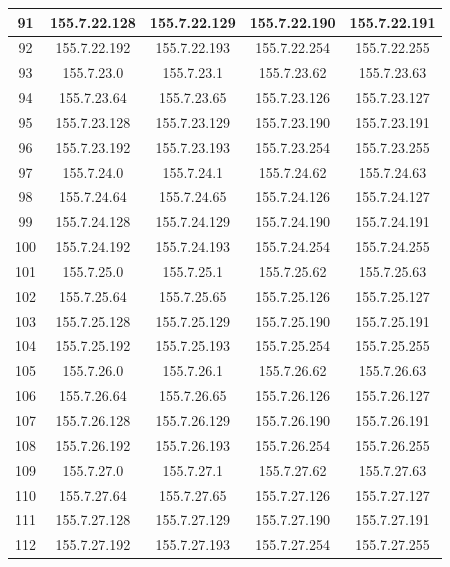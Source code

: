 \documentclass[letterpaper,12pt]{article}
\begin{document}
\begin{longtable}{|c|c|c|c|c|}
        91 & 155.7.22.128 & 155.7.22.129 & 155.7.22.190 & 155.7.22.191 \\ \hline
        92 & 155.7.22.192 & 155.7.22.193 & 155.7.22.254 & 155.7.22.255 \\ \hline
        93 & 155.7.23.0 & 155.7.23.1 & 155.7.23.62 & 155.7.23.63 \\ \hline
        94 & 155.7.23.64 & 155.7.23.65 & 155.7.23.126 & 155.7.23.127 \\ \hline
        95 & 155.7.23.128 & 155.7.23.129 & 155.7.23.190 & 155.7.23.191 \\ \hline
        96 & 155.7.23.192 & 155.7.23.193 & 155.7.23.254 & 155.7.23.255 \\ \hline
        97 & 155.7.24.0 & 155.7.24.1 & 155.7.24.62 & 155.7.24.63 \\ \hline
        98 & 155.7.24.64 & 155.7.24.65 & 155.7.24.126 & 155.7.24.127 \\ \hline
        99 & 155.7.24.128 & 155.7.24.129 & 155.7.24.190 & 155.7.24.191 \\ \hline
        100 & 155.7.24.192 & 155.7.24.193 & 155.7.24.254 & 155.7.24.255 \\ \hline
        101 & 155.7.25.0 & 155.7.25.1 & 155.7.25.62 & 155.7.25.63 \\ \hline
        102 & 155.7.25.64 & 155.7.25.65 & 155.7.25.126 & 155.7.25.127 \\ \hline
        103 & 155.7.25.128 & 155.7.25.129 & 155.7.25.190 & 155.7.25.191 \\ \hline
        104 & 155.7.25.192 & 155.7.25.193 & 155.7.25.254 & 155.7.25.255 \\ \hline
        105 & 155.7.26.0 & 155.7.26.1 & 155.7.26.62 & 155.7.26.63 \\ \hline
        106 & 155.7.26.64 & 155.7.26.65 & 155.7.26.126 & 155.7.26.127 \\ \hline
        107 & 155.7.26.128 & 155.7.26.129 & 155.7.26.190 & 155.7.26.191 \\ \hline
        108 & 155.7.26.192 & 155.7.26.193 & 155.7.26.254 & 155.7.26.255 \\ \hline
        109 & 155.7.27.0 & 155.7.27.1 & 155.7.27.62 & 155.7.27.63 \\ \hline
        110 & 155.7.27.64 & 155.7.27.65 & 155.7.27.126 & 155.7.27.127 \\ \hline
        111 & 155.7.27.128 & 155.7.27.129 & 155.7.27.190 & 155.7.27.191 \\ \hline
        112 & 155.7.27.192 & 155.7.27.193 & 155.7.27.254 & 155.7.27.255 \\ \hline

\end{longtable}
\end{document}
